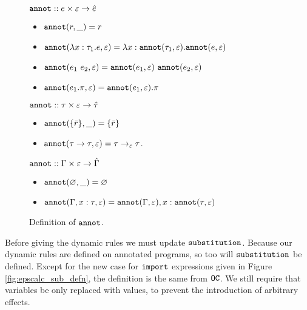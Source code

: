 \begin{figure}[h]
\vspace{-5pt}

$\mathtt{annot} :: e \times \varepsilon \rightarrow \hat e$

\begin{itemize}
	\setlength\itemsep{-0.2em}
	\item[] $\mathtt{annot}(r, \_) = r$
	\item[] $\mathtt{annot}(\lambda x: \tau_1 . e, \varepsilon) = \lambda x: \mathtt{annot}(\tau_1, \varepsilon) . \mathtt{annot}(e, \varepsilon)$
	\item[] $\mathtt{annot}(e_1~e_2, \varepsilon) = \mathtt{annot}(e_1, \varepsilon)~\mathtt{annot}(e_2, \varepsilon)$
	\item[] $\mathtt{annot}(e_1.\pi, \varepsilon) = \mathtt{annot}(e_1, \varepsilon).\pi$
\end{itemize}
	
$\mathtt{annot} :: \tau \times \varepsilon \rightarrow \hat \tau$

\begin{itemize}
	\setlength\itemsep{-0.2em}
	\item[] $\mathtt{annot}(\{ \bar r \}, \_) = \{ \bar r \}$
	\item[] $\mathtt{annot}(\tau \rightarrow \tau, \varepsilon) = \tau \rightarrow_{\varepsilon} \tau$.	
\end{itemize}

$\mathtt{annot} :: \Gamma \times \varepsilon \rightarrow \hat \Gamma$

\begin{itemize}
	\setlength\itemsep{-0.2em}
	\item[] $\mathtt{annot}(\varnothing, \_) = \varnothing$
	\item[] $\mathtt{annot}(\Gamma, x: \tau, \varepsilon) = \mathtt{annot}(\Gamma, \varepsilon), x: \mathtt{annot}(\tau, \varepsilon)$
\end{itemize}

\vspace{-7pt}
\caption{Definition of $\mathtt{annot}$.}
\label{fig:annot_defn}
\end{figure}

Before giving the dynamic rules we must update $\mathtt{substitution}$. Because our dynamic rules are defined on annotated programs, so too will $\mathtt{substitution}$ be defined. Except for the new case for $\mathtt{import}$ expressions given in Figure \ref{fig:epscalc_sub_defn}, the definition is the same from $\mathtt{OC}$. We still require that variables be only replaced with values, to prevent the introduction of arbitrary effects.

